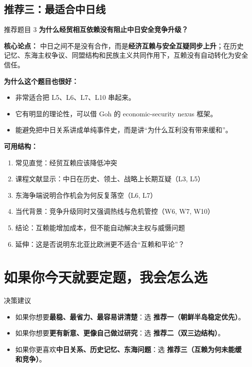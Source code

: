 \documentclass[a4paper]{article}
\begin{document}
\subsection{推荐三：最适合中日线}

\begin{findingbox}{推荐题目 3}
\textbf{为什么经贸相互依赖没有阻止中日安全竞争升级？}
\end{findingbox}

\textbf{核心论点：}  
中日之间不是没有合作，而是\textbf{经济互赖与安全互疑同步上升}；在历史记忆、东海主权争议、同盟结构和民族主义共同作用下，互赖没有自动转化为安全信任。

\textbf{为什么这个题目也很好：}
\begin{itemize}
\item 非常适合把 L5、L6、L7、L10 串起来。
\item 它有明显的理论性，可以借 Goh 的 economic-security nexus 框架。
\item 能避免把中日关系讲成单纯事件史，而是讲``为什么互利没有带来缓和''。
\end{itemize}

\textbf{可用结构：}
\begin{enumerate}
\item 常见直觉：经贸互赖应该降低冲突
\item 课程文献显示：中日在历史、领土、战略上长期互疑（L3, L5）
\item 东海争端说明合作机会为何反复落空（L6, L7）
\item 当代背景：竞争升级同时又强调热线与危机管控（W6, W7, W10）
\item 结论：互赖能增加成本，但不能自动解决主权与威慑问题
\item 延伸：这是否说明东北亚比欧洲更不适合``互赖和平论''？
\end{enumerate}

\section{如果你今天就要定题，我会怎么选}

\begin{findingbox}{决策建议}
\begin{itemize}
\item 如果你想要\textbf{最稳、最省力、最容易讲清楚}：选 \textbf{推荐一（朝鲜半岛稳定优先）}。
\item 如果你想要\textbf{更有新意、更像自己做过研究}：选 \textbf{推荐二（双三边结构）}。
\item 如果你更喜欢\textbf{中日关系、历史记忆、东海问题}：选 \textbf{推荐三（互赖为何未能缓和竞争）}。
\end{itemize}
\end{findingbox}
\end{document}
